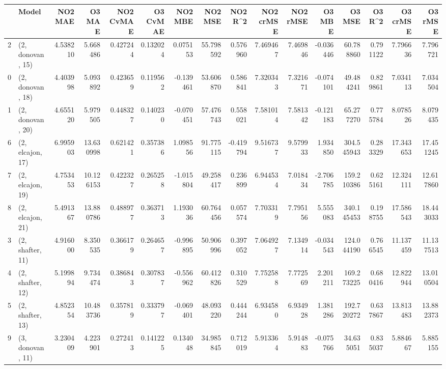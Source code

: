 \begin{tabular}{llrrrrrrrrrrrrrr}
\toprule
{} &             Model &    NO2 MAE &     O3 MAE &  NO2 CvMAE &  O3 CvMAE &   NO2 MBE &     NO2 MSE &   NO2 R\textasciicircum2 &  NO2 crMSE &   NO2 rMSE &     O3 MBE &      O3 MSE &    O3 R\textasciicircum2 &   O3 crMSE &    O3 rMSE \\
\midrule
2  &  (2, donovan, 15) &   4.538210 &   5.668486 &   0.427244 &  0.132024 &  0.075153 &   55.798592 &  0.576960 &   7.469467 &   7.469846 &  -0.036446 &   60.788860 &  0.791122 &   7.796636 &   7.796721 \\
0  &  (2, donovan, 18) &   4.403998 &   5.093892 &   0.423659 &  0.119562 & -0.139461 &   53.606870 &  0.586841 &   7.320343 &   7.321671 &  -0.074101 &   49.484241 &  0.829861 &   7.034113 &   7.034504 \\
1  &  (2, donovan, 20) &   4.655120 &   5.979505 &   0.448327 &  0.140230 & -0.070451 &   57.476743 &  0.558021 &   7.581014 &   7.581342 &  -0.121183 &   65.277270 &  0.775784 &   8.078526 &   8.079435 \\
6  &  (2, elcajon, 17) &   6.995903 &  13.630998 &   0.621421 &  0.357386 &  1.098556 &   91.775115 & -0.419794 &   9.516737 &   9.579933 &   1.934850 &  304.545943 &  0.283329 &  17.343653 &  17.451245 \\
7  &  (2, elcajon, 19) &   4.753453 &  10.126153 &   0.422327 &  0.265258 & -1.015804 &   49.258417 &  0.236899 &   6.944534 &   7.018434 &  -2.706785 &  159.210386 &  0.625161 &  12.324111 &  12.617860 \\
8  &  (2, elcajon, 21) &   5.491367 &  13.880786 &   0.488977 &  0.363713 &  1.193036 &   60.764456 &  0.057574 &   7.703319 &   7.795156 &   5.555083 &  340.145453 &  0.198755 &  17.586543 &  18.443033 \\
3  &  (2, shafter, 11) &   4.916000 &   8.350535 &   0.366179 &  0.264657 & -0.996895 &   50.906996 &  0.397052 &   7.064927 &   7.134914 &  -0.034543 &  124.044190 &  0.766545 &  11.137459 &  11.137513 \\
4  &  (2, shafter, 12) &   5.199894 &   9.734474 &   0.386843 &  0.307837 & -0.556962 &   60.412826 &  0.310529 &   7.752588 &   7.772569 &   2.201211 &  169.273225 &  0.680416 &  12.822944 &  13.010504 \\
5  &  (2, shafter, 13) &   4.852354 &  10.483736 &   0.357819 &  0.333797 & -0.069401 &   48.093220 &  0.444244 &   6.934580 &   6.934928 &   1.381286 &  192.720272 &  0.637867 &  13.813483 &  13.882373 \\
9  &  (3, donovan, 11) &   3.230409 &   4.223901 &   0.272413 &  0.141225 &  0.134048 &   34.985845 &  0.712019 &   5.913364 &   5.914883 &  -0.075766 &   34.635051 &  0.835037 &   5.884667 &   5.885155 \\

\end{tabular}
